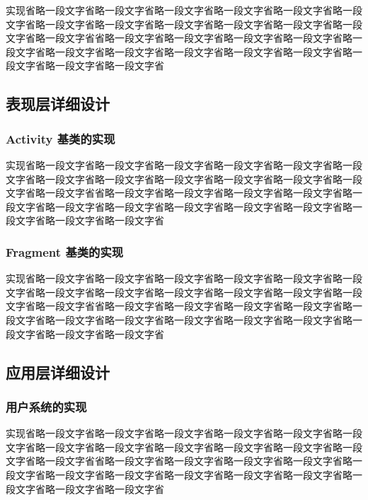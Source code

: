 	实现省略一段文字省略一段文字省略一段文字省略一段文字省略一段文字省略一段文字省略一段文字省略一段文字省略一段文字省略一段文字省略一段文字省略一段文字省略一段文字省省略一段文字省略一段文字省略一段文字省略一段文字省略一段文字省略一段文字省略一段文字省略一段文字省略一段文字省略一段文字省略一段文字省略一段文字省略一段文字省
		
          

  \subsection{表现层详细设计}
	
	  \subsubsection{Activity 基类的实现}
	  
		实现省略一段文字省略一段文字省略一段文字省略一段文字省略一段文字省略一段文字省略一段文字省略一段文字省略一段文字省略一段文字省略一段文字省略一段文字省略一段文字省省略一段文字省略一段文字省略一段文字省略一段文字省略一段文字省略一段文字省略一段文字省略一段文字省略一段文字省略一段文字省略一段文字省略一段文字省略一段文字省
	  		

	  
	  	  
	  \subsubsection{Fragment 基类的实现}
	  
		实现省略一段文字省略一段文字省略一段文字省略一段文字省略一段文字省略一段文字省略一段文字省略一段文字省略一段文字省略一段文字省略一段文字省略一段文字省略一段文字省省略一段文字省略一段文字省略一段文字省略一段文字省略一段文字省略一段文字省略一段文字省略一段文字省略一段文字省略一段文字省略一段文字省略一段文字省略一段文字省
		

  \subsection{应用层详细设计}
  	
		\subsubsection{用户系统的实现}
		
		实现省略一段文字省略一段文字省略一段文字省略一段文字省略一段文字省略一段文字省略一段文字省略一段文字省略一段文字省略一段文字省略一段文字省略一段文字省略一段文字省省略一段文字省略一段文字省略一段文字省略一段文字省略一段文字省略一段文字省略一段文字省略一段文字省略一段文字省略一段文字省略一段文字省略一段文字省略一段文字省
		
